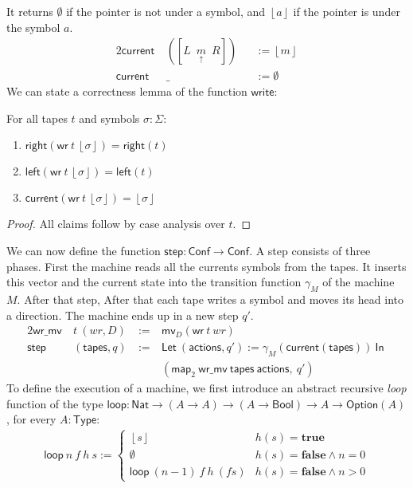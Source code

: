 \documentclass{psartcl}
\newcommand{\MS}[1]{\textsf{#1}}
\newcommand{\from}{:}
\renewcommand{\to}{\rightarrow}
\newcommand{\Option}{\MS{Option}}
\newcommand{\Bool}{\MS{Bool}}
\newcommand{\Nat}{\MS{Nat}}
\newcommand{\Type}{\MS{Type}}
\newcommand{\Some}[1]{\left\lfloor #1\right\rfloor}
\renewcommand{\None}{\emptyset}
\newcommand{\true}{\mathbf{true}}
\newcommand{\false}{\mathbf{false}}
\newcommand{\tape}[1]{[ #1 ]}
\newcommand{\tapePointer}[1]{\; \underset{\uparrow}{#1} \;}
\newcommand{\midtape}[3]{\tape{#1 ~ \tapePointer{#2} ~ #3}}
\newcommand{\mlet}[2]{\MS{Let}~#1~\MS{In}~#2}
\begin{document}
It returns $\None$ if the pointer is not under a symbol, and $\Some a$ if the pointer is under the symbol $a$.
\begin{alignat*}{2}
  \MS{current}&~(\midtape{L}{m}{R})&&:= \Some m \\
  \MS{current}&~\_                 &&:= \None
\end{alignat*}
We can state a correctness lemma of the function $\MS{write}$:
\begin{lemma}[Write]
  \label{lem:write}
  For all tapes $t$ and symbols $\sigma:\Sigma$:
  \begin{enumerate}
    \item $\MS{right}   (\MS{wr}~t~\Some\sigma) = \MS{right}(t)$
    \item $\MS{left}    (\MS{wr}~t~\Some\sigma) = \MS{left} (t)$
    \item $\MS{current} (\MS{wr}~t~\Some\sigma) = \Some\sigma$
  \end{enumerate}
\end{lemma}
\begin{proof}
  All claims follow by case analysis over $t$.
\end{proof}
We can now define the function $\MS{step} \from \MS{Conf} \to \MS{Conf}$.  A step consists of three phases.  First the machine reads all the currents
symbols from the tapes.  It inserts this vector and the current state into the transition function $\gamma_M$ of the machine $M$.  After that step,
After that each tape writes a symbol and moves its head into a direction.  The machine ends up in a new step $q'$.
\begin{alignat*}{2}
  \MS{wr\_mv}&~t~(wr, D)     &~:=~& \MS{mv}_D (\MS{wr}~t~wr) \\
  \MS{step}&~(\MS{tapes}, q) &~:=~& \mlet{(\MS{actions}, q') := \gamma_M(\MS{current}(\MS{tapes}))}{ \\
           &                  &~  ~& (\MS{map}_2~\MS{wr\_mv}~\MS{tapes}~\MS{actions},~ q')}
\end{alignat*}
To define the execution of a machine, we first introduce an abstract recursive \emph{loop} function of the type
$\MS{loop} \from \Nat \to (A \to A) \to (A \to \Bool) \to A \to \Option(A)$, for every $A:\Type$:
\begin{align*}
  \MS{loop}~n~f~h~s :=
  \begin{cases}
    \Some{s}              & h(s) = \true \\
    \None                 & h(s) = \false \land n = 0 \\
    \MS{loop}~(n-1)~f~h~(f s)  & h(s) = \false \land n > 0
  \end{cases}
\end{align*}
\end{document}
